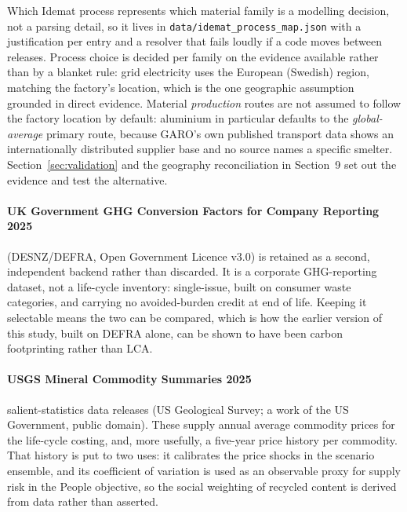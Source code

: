 \documentclass[11pt,a4paper]{article}
\begin{document}
Which Idemat process represents which material family is a modelling decision,
not a parsing detail, so it lives in
\texttt{data/idemat\_process\_map.json} with a justification per entry and a
resolver that fails loudly if a code moves between releases. Process choice is
decided per family on the evidence available rather than by a blanket rule:
grid electricity uses the European (Swedish) region, matching the factory's
location, which is the one geographic assumption grounded in direct evidence.
Material \emph{production} routes are not assumed to follow the factory
location by default: aluminium in particular defaults to the
\emph{global-average} primary route, because GARO's own published transport
data shows an internationally distributed supplier base and no source names a
specific smelter. Section~\ref{sec:validation} and the geography
reconciliation in Section~9 set out the evidence and test the alternative.

\paragraph{UK Government GHG Conversion Factors for Company Reporting 2025}
(DESNZ/DEFRA, Open Government Licence v3.0) is retained as a second,
independent backend rather than discarded. It is a corporate GHG-reporting
dataset, not a life-cycle inventory: single-issue, built on consumer waste
categories, and carrying no avoided-burden credit at end of life. Keeping it
selectable means the two can be compared, which is how the earlier version
of this study, built on DEFRA alone, can be shown to have been carbon
footprinting rather than LCA.

\paragraph{USGS Mineral Commodity Summaries 2025} salient-statistics data
releases (US Geological Survey; a work of the US Government, public domain).
These supply annual average commodity prices for the life-cycle costing, and,
more usefully, a five-year price history per commodity. That history
is put to two uses: it calibrates the price shocks in the scenario ensemble,
and its coefficient of variation is used as an observable proxy for supply
risk in the People objective, so the social weighting of recycled content is
derived from data rather than asserted.
\end{document}

